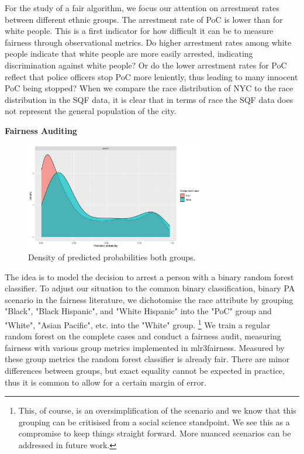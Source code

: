 For the study of a fair algorithm, we focus our attention on arrestment rates between different ethnic groups.
The arrestment rate of PoC is lower than for white people. This is a first indicator for how difficult it can be to measure fairness through observational metrics. Do higher arrestment rates among white people indicate that white people are more easily arrested, indicating discrimination against white people? Or do the lower arrestment rates for PoC reflect that police officers stop PoC more leniently, thus leading to many innocent PoC being stopped?
When we compare the race distribution of NYC to the race distribution in the SQF data, it is clear that in terms of race the SQF data does not represent the general population of the city.

\textbf{Fairness Auditing}
\begin{figure}
    \centering
    \includegraphics[width=0.7\textwidth]{../figures/sqf_case_study_plot1.png}
    \caption{Density of predicted probabilities both groups.}
    \label{fig:fairness_density}
\end{figure}
The idea is to model the decision to arrest a person with a binary random forest classifier. To adjust our situation to the common binary classification, binary PA scenario in the fairness literature, we
dichotomise the race attribute by grouping "Black", "Black Hispanic", and "White Hispanic" into the "PoC" group and "White", "Asian Pacific", etc. into the "White" group. \footnote{This, of course, is an oversimplification of the scenario and we know that this grouping can be critisised from a social science standpoint. We see this as a compromise to keep things straight forward. More nuanced scenarios can be addressed in future work.} 
We train a regular random forest on the complete cases and conduct a fairness audit, measuring fairness with various group metrics implemented in mlr3fairness.
Measured by these group metrics the random forest classifier is already fair. There are minor differences between groups, but exact equality cannot be expected in practice, thus it is common to allow for a certain margin of error.
